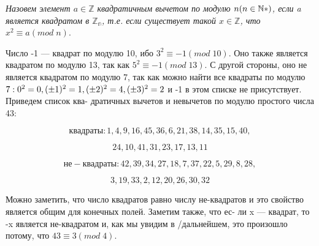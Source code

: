 \documentclass{../template/mai_book}
\begin{document}
\begin{determ}
\slshape{Назовем элемент $a \in \mathbb{Z}$ квадратичным вычетом по модулю $n \linebreak (n \in \mathbb{N*})$, если a является квадратом в $\mathbb{Z_{n}}$, т.е. если существует такой \linebreak $x \in \mathbb{Z}$, что $x^{2} \equiv a (mod \; n).$} \par 
\end{determ}
\noindent  {} \par 
  Число -1 --- квадрат по модулю 10, ибо $3^{2} \equiv -1 (mod \; 10)$. Оно \linebreak также является квадратом по модулю 13, так как $5^{2} \equiv -1 (mod \; 13)$. \linebreak С другой стороны, оно не является квадратом по модулю 7, так как \linebreak можно найти все квадраты по модулю $7: {0^{2}} = 0, (\pm 1)^{2} = 1, (\pm 2)^{2} = 4, \linebreak (\pm 3)^{2} = 2$ и -1 в этом списке не присутствует. Приведем список ква- \linebreak дратичных вычетов и невычетов по модулю простого числа 43: \par 
  
  $$квадраты: 1,4,9,16,45,36,6,21,38,14,35,15,40,$$ \par 
  $$ 24,10,41,31,23,17,13,11$$ \par 
  $$не-квадраты: 42,39,34,27,18,7,37,22,5,29,8,28,$$ \par 
  $$3,19,33,2,12,20,26,30,32$$ \par \newpage 
  
  
\noindent Можно заметить, что число квадратов равно числу не-квадратов и это \linebreak свойство является общим для конечных полей. Заметим также, что ес- \linebreak ли x --- квадрат, то -x является не-квадратом и, как мы увидим в /\linebreak дальнейшем, это произошло потому, что $43 \equiv 3 (mod \; 4).$ \linebreak
 
\end{document}
